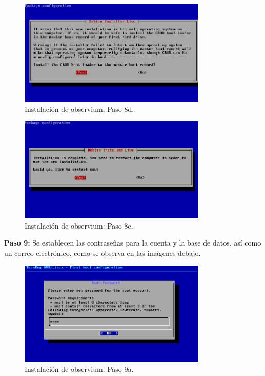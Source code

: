 \begin{figure}[htbp!]
	\centering
		\includegraphics[width=0.8\textwidth]{images/desarrollo/instalarObservium_paso8d.png}
	\caption{Instalación de observium: Paso 8d.}
\end{figure}

\begin{figure}[htbp!]
	\centering
		\includegraphics[width=0.8\textwidth]{images/desarrollo/instalarObservium_paso8e.png}
	\caption{Instalación de observium: Paso 8e.}
\end{figure}

\pagebreak
\noindent
\textbf{Paso 9:} Se establecen las contraseñas para la cuenta y la base de datos, así como un correo electrónico, como se observa en las imágenes debajo. 

\begin{figure}[htbp!]
	\centering
		\includegraphics[width=0.8\textwidth]{images/desarrollo/instalarObservium_paso9a.png}
	\caption{Instalación de observium: Paso 9a.}
\end{figure}

